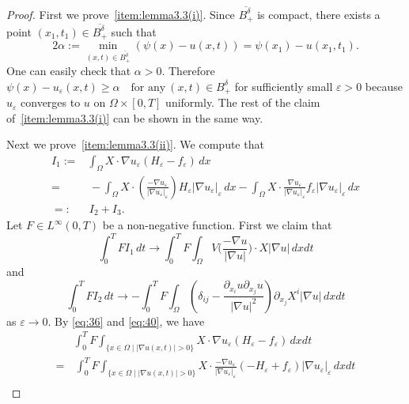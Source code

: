 \documentclass{amsart}
\theoremstyle{definition}
\begin{document}
\begin{proof}
First we prove~\eqref{item:lemma3.3(i)}. Since $\overline{B_+ ^\delta}$ is compact, there exists a point $(x_1,t_1) \in \overline{B_+ ^\delta}$ such that
\[
2\alpha := \min _{(x,t) \in \overline{B_+ ^\delta}} (\psi (x) - u (x,t))
=\psi (x_1) - u (x_1,t_1).
\]
One can easily check that $\alpha>0$. Therefore $\psi (x) - u_\varepsilon (x,t) \geq \alpha \quad \text{for any} \ (x,t) \in B_ + ^\delta$ for sufficiently small $\varepsilon>0$
because $u_\varepsilon$ converges to $u$ on $\Omega \times [0,T]$ uniformly.
The rest of the claim of~\eqref{item:lemma3.3(i)} can be shown in the same way.

Next we prove~\eqref{item:lemma3.3(ii)}. We compute that
\begin{equation}
\begin{split}
I_1 := & \int_{\Omega} X\cdot \nabla u_\varepsilon
(H_\varepsilon -f_\varepsilon ) \, dx \\
= & \,
-\int_{\Omega} X\cdot \left(\frac{-\nabla u_\varepsilon}{|\nabla u_\varepsilon |_\varepsilon}\right)
H_\varepsilon |\nabla u_\varepsilon|_\varepsilon \, dx
-
\int_{\Omega} X\cdot \frac{\nabla u_\varepsilon}{|\nabla u_\varepsilon |_\varepsilon}
f_\varepsilon |\nabla u_\varepsilon|_\varepsilon \, dx
\\
=: & \, I_2 +I_3.
\end{split}
\end{equation}
Let $F \in L^\infty (0,T)$ be a non-negative function. First we claim that
\begin{equation}\label{I1}
\int_0 ^T F I_1 \, dt \to \int_0 ^T F
\int_{\Omega} V \Big(\frac{-\nabla u}{|\nabla u|}\Big) \cdot X |\nabla u| \, dx dt 
\end{equation}
and 
\begin{equation}\label{I2}
\int_0 ^T F I_2 \, dt \to -\int_0 ^T F
\int_{\Omega} \left( \delta_{ij} - \frac{ \partial_{x_i} u \partial _{x_j} u }{|\nabla u|^2} \right)
\partial_{x_j} X^i |\nabla u| \, dx dt 
\end{equation}
as $\varepsilon \to 0$.
By \eqref{eq:36} and \eqref{eq:40}, we have
\begin{equation*}
\begin{split}
&\int_0 ^T F \int _{\{ x \in \Omega \mid |\nabla u (x,t)|>0 \}} X \cdot \nabla u_\varepsilon (H_\varepsilon - f_\varepsilon )  \, dx dt\\
=& \, 
\int_0 ^T F \int _{\{ x \in \Omega \mid |\nabla u (x,t)|>0 \}} 
X \cdot \frac{-\nabla u_\varepsilon }{|\nabla u_\varepsilon |_\varepsilon}
(-H_\varepsilon + f_\varepsilon ) |\nabla u_\varepsilon |_\varepsilon \, dx dt \\

\end{split}
\end{equation*}
\end{proof}
\end{document}
